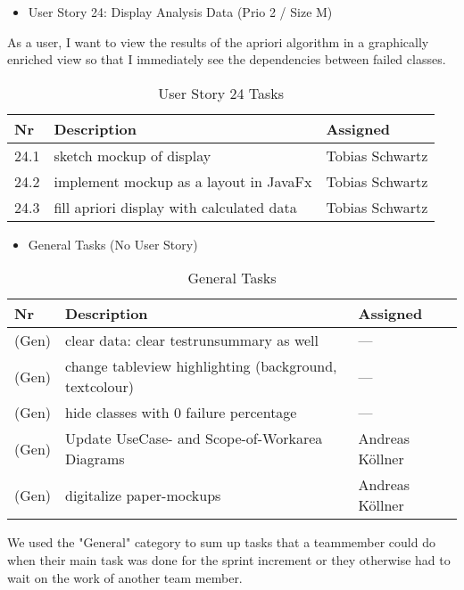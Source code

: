 \newpage
\begin{itemize}
	\item User Story 24: Display Analysis Data (Prio 2 / Size M)
	\end{itemize}
As a user,
I want to view the results of the apriori algorithm in a graphically enriched view
so that I immediately see the dependencies between failed classes.
\begin{table}[h]
  \caption{User Story 24 Tasks}
  \label{Story 24 Tasks}
  \centering
  \begin{tabular}{p{1cm}|p{5cm}|p{3cm}|}
  	Nr & Description & Assigned \\ 
  	\hline
  	24.1 & sketch mockup of display & Tobias Schwartz \\ 
  	\hline
  	24.2 & implement mockup as a layout in JavaFx & Tobias Schwartz \\ 
  	\hline
  	24.3 & fill apriori display with calculated data & Tobias Schwartz \\ 
  	\hline
  \end{tabular}
\end{table}

\begin{itemize}
	\item General Tasks (No User Story)
	\end{itemize}

\begin{table}[h]
  \caption{General Tasks}
  \label{General Tasks}
  \centering
  \begin{tabular}{p{1cm}|p{5cm}|p{3cm}|}
  	Nr & Description & Assigned \\ 
  	\hline
  	(Gen) & clear data: clear testrunsummary as well & --- \\ 
  	\hline
  	(Gen) & change tableview highlighting (background, textcolour) & --- \\ 
  	\hline
  	(Gen) & hide classes with 0 failure percentage & --- \\ 
  	\hline
  	(Gen) & Update UseCase- and Scope-of-Workarea Diagrams & Andreas Köllner \\ 
  	\hline
  	(Gen) & digitalize paper-mockups & Andreas Köllner \\ 
  	\hline
  \end{tabular}
\end{table}
We used the "General" category to sum up tasks that a teammember could do when their main task was done for the sprint increment or they otherwise had to wait on the work of another team member. 

